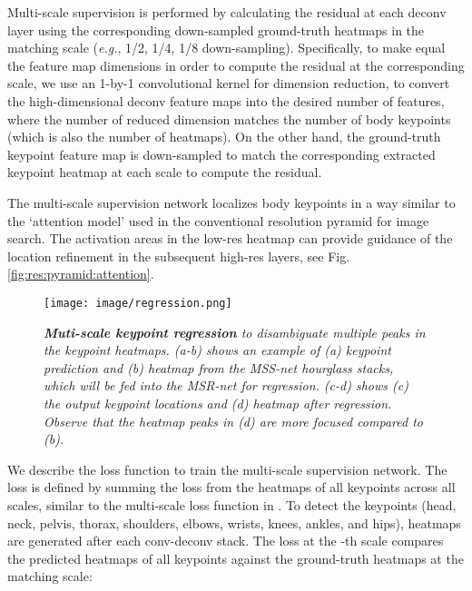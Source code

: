 \documentclass[runningheads]{llncs}
\begin{document}
Multi-scale supervision is performed by calculating the residual at each deconv layer using the corresponding down-sampled ground-truth heatmaps in the matching scale ({\em e.g.}, 1/2, 1/4, 1/8 down-sampling). 
Specifically, to make equal the feature map dimensions in order to compute the residual at the corresponding scale, we use an 1-by-1 convolutional kernel for dimension reduction, to convert the high-dimensional deconv feature maps into the desired number of features, where the number of reduced dimension matches the number of body keypoints (which is also the number of heatmaps). 
On the other hand, the ground-truth keypoint feature map is down-sampled to match the corresponding extracted keypoint heatmap at each scale to compute the residual.

The multi-scale supervision network localizes body keypoints in a way similar to the `attention model' \cite{Zhao2017Diversified} used in the conventional resolution pyramid for image search.
The activation areas in the low-res heatmap can provide guidance of the location refinement in the subsequent high-res layers, see Fig. \ref{fig:res:pyramid:attention}.





\begin{figure}[t]
\centerline{
\texttt{[image: image/regression.png]}
}
\caption{\em \small 
\textbf{Muti-scale keypoint regression} to disambiguate multiple peaks in the keypoint heatmaps. 
(a-b) shows an example of (a) keypoint prediction and (b) heatmap from the MSS-net hourglass stacks, which will be fed into the MSR-net for regression. 
(c-d) shows (c) the output keypoint locations and (d) heatmap after regression. 
Observe that the heatmap peaks in (d) are more focused compared to (b). 
}
\label{fig:keypoint_regression}
\end{figure}








We describe the loss function  to train the multi-scale supervision network.
The loss  is defined by summing the  loss from the heatmaps of all keypoints across all scales, similar to the multi-scale loss function in \cite{wei2016convolutional,newell2016stacked}.
To detect the  keypoints (head, neck, pelvis, thorax, shoulders, elbows, wrists, knees, ankles, and hips),  heatmaps are generated after each conv-deconv stack. 
The loss at the -th scale compares the predicted heatmaps of all keypoints against the ground-truth heatmaps at the matching scale:
\end{document}
